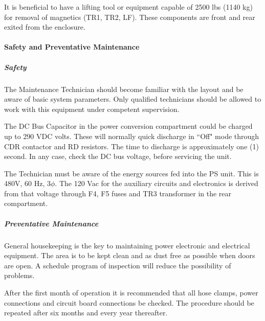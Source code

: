 It is beneficial to have a lifting tool or equipment capable of
2500 lbs (1140 kg) for removal of magnetics (TR1, TR2, LF). These
components are front and rear exited from the enclosure.


\paragraph{Safety and Preventative Maintenance}

\subparagraph{Safety}

The Maintenance Technician should become familiar with the layout
and be aware of basic system parameters.  Only qualified technicians
should be allowed to work with this equipment under competent
supervision.

The DC Bus Capacitor in the power conversion compartment could be
charged up to 290 VDC volts.  These will normally quick discharge in
``Off" mode through CDR contactor and RD resistors.  The time to
discharge is approximately one (1) second.  In any case, check the DC
bus voltage, before servicing the unit.

The Technician must be aware of the energy sources fed into the
PS unit.  This is 480V, 60 Hz, 3$\phi$.  The 120 Vac for the auxiliary
circuits and electronics is derived from that voltage through F4, F5
fuses and TR3 transformer in the rear compartment.

\subparagraph{Preventative Maintenance}

General housekeeping is the key to maintaining power electronic
and electrical equipment.  The area is to be kept clean and as dust free
as possible when doors are open.  A schedule program of inspection will
reduce the possibility of problems.

After the first month of operation it is recommended that all
hose clamps, power connections and circuit board connections be checked.
 The procedure should be repeated after six months and every year
thereafter.

